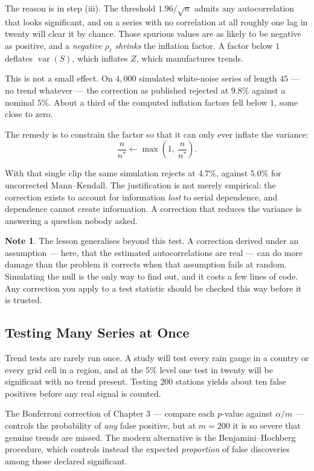 \documentclass[11pt,a4paper]{article}
\theoremstyle{definition}
\newtheorem{note}[thm]{Note}
\begin{document}
The reason is in step (iii). The threshold $1.96/\sqrt{n}$ admits any
autocorrelation that looks significant, and on a series with no correlation at
all roughly one lag in twenty will clear it by chance. Those spurious values are
as likely to be negative as positive, and a \emph{negative} $\rho_\ell$
\emph{shrinks} the inflation factor. A factor below $1$ deflates
$\operatorname{var}(S)$, which inflates $Z$, which manufactures trends.

This is not a small effect. On $4{,}000$ simulated white-noise series of length
$45$ --- no trend whatever --- the correction as published rejected at
$\mathbf{9.8\%}$ against a nominal $5\%$. About a third of the computed inflation
factors fell below $1$, some close to zero.

The remedy is to constrain the factor so that it can only ever inflate the
variance:
$$\dfrac{n}{n^{*}} \longleftarrow \max\left(1,\ \dfrac{n}{n^{*}}\right).$$

With that single clip the same simulation rejects at $4.7\%$, against $5.0\%$ for
uncorrected Mann--Kendall. The justification is not merely empirical: the
correction exists to account for information \emph{lost} to serial dependence,
and dependence cannot create information. A correction that reduces the variance
is answering a question nobody asked.

\begin{note}
The lesson generalises beyond this test. A correction derived under an assumption
--- here, that the estimated autocorrelations are real --- can do more damage than
the problem it corrects when that assumption fails at random. Simulating the null
is the only way to find out, and it costs a few lines of code. Any correction you
apply to a test statistic should be checked this way before it is trusted.
\end{note}

\subsection{Testing Many Series at Once}

Trend tests are rarely run once. A study will test every rain gauge in a country
or every grid cell in a region, and at the $5\%$ level one test in twenty will be
significant with no trend present. Testing $200$ stations yields about ten false
positives before any real signal is counted.

The Bonferroni correction of Chapter 3 --- compare each $p$-value against
$\alpha/m$ --- controls the probability of \emph{any} false positive, but at
$m = 200$ it is so severe that genuine trends are missed. The modern alternative
is the Benjamini--Hochberg procedure, which controls instead the expected
\emph{proportion} of false discoveries among those declared significant.
\end{document}

